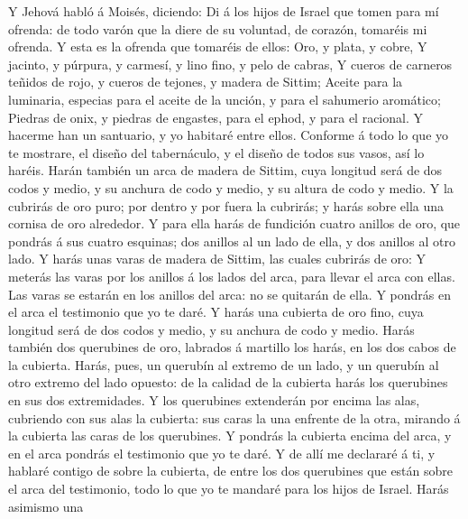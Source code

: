  Y Jehová habló á Moisés, diciendo:  Di á
los hijos de Israel que tomen para mí ofrenda: de todo varón que la
diere de su voluntad, de corazón, tomaréis mi ofrenda.  Y
esta es la ofrenda que tomaréis de ellos: Oro, y plata, y cobre,
 Y jacinto, y púrpura, y carmesí, y lino fino, y pelo de
cabras,  Y cueros de carneros teñidos de rojo, y cueros de
tejones, y madera de Sittim;  Aceite para la luminaria,
especias para el aceite de la unción, y para el sahumerio aromático;
 Piedras de onix, y piedras de engastes, para el ephod, y
para el racional.  Y hacerme han un santuario, y yo
habitaré entre ellos.  Conforme á todo lo que yo te
mostrare, el diseño del tabernáculo, y el diseño de todos sus vasos, así
lo haréis.  Harán también un arca de madera de Sittim,
cuya longitud será de dos codos y medio, y su anchura de codo y medio, y
su altura de codo y medio.  Y la cubrirás de oro puro;
por dentro y por fuera la cubrirás; y harás sobre ella una cornisa de
oro alrededor.  Y para ella harás de fundición cuatro
anillos de oro, que pondrás á sus cuatro esquinas; dos anillos al un
lado de ella, y dos anillos al otro lado.  Y harás unas
varas de madera de Sittim, las cuales cubrirás de oro:  Y
meterás las varas por los anillos á los lados del arca, para llevar el
arca con ellas.  Las varas se estarán en los anillos del
arca: no se quitarán de ella.  Y pondrás en el arca el
testimonio que yo te daré.  Y harás una cubierta de oro
fino, cuya longitud será de dos codos y medio, y su anchura de codo y
medio.  Harás también dos querubines de oro, labrados á
martillo los harás, en los dos cabos de la cubierta. 
Harás, pues, un querubín al extremo de un lado, y un querubín al otro
extremo del lado opuesto: de la calidad de la cubierta harás los
querubines en sus dos extremidades.  Y los querubines
extenderán por encima las alas, cubriendo con sus alas la cubierta: sus
caras la una enfrente de la otra, mirando á la cubierta las caras de los
querubines.  Y pondrás la cubierta encima del arca, y en
el arca pondrás el testimonio que yo te daré.  Y de allí
me declararé á ti, y hablaré contigo de sobre la cubierta, de entre los
dos querubines que están sobre el arca del testimonio, todo lo que yo te
mandaré para los hijos de Israel.  Harás asimismo una
